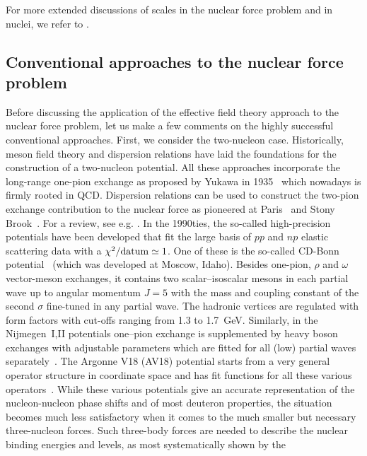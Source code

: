 \documentclass[aps,rmp,nofootinbib,twocolumn,floatfix]{revtex4}
\begin{document}
For more extended discussions of scales in the nuclear force
problem and in nuclei, we refer to 
\cite{Friar:1995dt,Friar:1996zw,Kaiser:2006tu,Delfino:2007zu}.

\subsection{Conventional approaches to the nuclear force problem}
\label{sec:conventional}

Before discussing the application of the  effective field theory approach 
to the nuclear force problem, let us make a few comments on the highly
successful conventional approaches. First, we consider the two-nucleon
case. Historically, meson field theory and dispersion relations have 
laid the foundations for the construction of a two-nucleon potential.
All these approaches incorporate the long-range one-pion exchange
as proposed by Yukawa in 1935~\cite{Yukawa:1935xg} which nowadays is
firmly rooted in QCD. Dispersion relations can be used to construct the
two-pion exchange contribution to the nuclear force as pioneered at 
Paris~\cite{Cottingham:1973wt} and Stony Brook~\cite{Jackson:1975be}.
For a review, see e.g. \cite{Machleidt:2001rw}. In
the 1990ties, the so-called high-precision potentials have been
developed that fit the large basis of $pp$ and $np$ elastic scattering data
with a $\chi^2/{\rm datum} \simeq 1$. One of these is the so-called CD-Bonn
potential~\cite{Machleidt:2000ge} (which was developed at Moscow, Idaho).
Besides one-pion, $\rho$ and $\omega$
vector-meson exchanges, it contains two scalar--isoscalar
mesons in each partial wave up to angular momentum $J=5$ with the mass and
coupling constant of the second $\sigma$ fine-tuned in any partial wave.
The hadronic vertices are regulated with form factors with cut-offs
ranging from 1.3 to 1.7~GeV. Similarly, in  the
Nijmegen~I,II potentials one--pion exchange is supplemented by 
heavy boson exchanges with
adjustable parameters which are fitted for all (low) partial waves
separately~\cite{Stoks:1994wp}.
The Argonne V18 (AV18) potential starts from a very general operator
structure in coordinate space and has fit functions for all these
various operators~\cite{Wiringa:1994wb}. While these various potentials
give an accurate representation of the nucleon-nucleon phase shifts and
of most deuteron properties, the situation becomes much less satisfactory
when it comes to the much smaller but necessary three-nucleon forces.
Such three-body forces are needed to describe the nuclear binding
energies and levels, as most systematically shown by the
\end{document}
